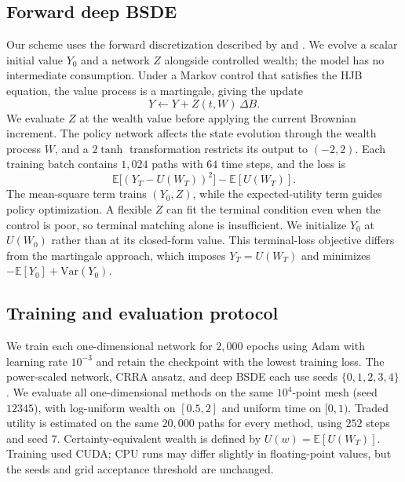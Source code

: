 \documentclass[11pt,a4paper]{article}
\newcommand{\E}{\mathbb{E}}
\begin{document}
\subsection{Forward deep BSDE}

Our scheme uses the forward discretization described by \citet{han2018} and \citet{e2017}. We evolve a scalar initial value $Y_0$ and a network $Z$ alongside controlled wealth; the model has no intermediate consumption. Under a Markov control that satisfies the HJB equation, the value process is a martingale, giving the update
\begin{equation}
Y \leftarrow Y + Z(t,W)\,\Delta B.
\end{equation}
We evaluate $Z$ at the wealth value before applying the current Brownian increment. The policy network affects the state evolution through the wealth process $W$, and a $2\tanh$ transformation restricts its output to $(-2,2)$. Each training batch contains $1{,}024$ paths with $64$ time steps, and the loss is
\begin{equation}
\E\big[(Y_T-U(W_T))^2\big] - \E[U(W_T)].
\end{equation}
The mean-square term trains $(Y_0,Z)$, while the expected-utility term guides policy optimization. A flexible $Z$ can fit the terminal condition even when the control is poor, so terminal matching alone is insufficient. We initialize $Y_0$ at $U(W_0)$ rather than at its closed-form value. This terminal-loss objective differs from the martingale approach, which imposes $Y_T=U(W_T)$ and minimizes $-\E[Y_0]+\mathrm{Var}(Y_0)$.

\subsection{Training and evaluation protocol}

We train each one-dimensional network for $2{,}000$ epochs using Adam with learning rate $10^{-3}$ and retain the checkpoint with the lowest training loss. The power-scaled network, CRRA ansatz, and deep BSDE each use seeds $\{0,1,2,3,4\}$. We evaluate all one-dimensional methods on the same $10^{4}$-point mesh (seed $12345$), with log-uniform wealth on $[0.5,2]$ and uniform time on $[0,1)$. Traded utility is estimated on the same $20{,}000$ paths for every method, using $252$ steps and seed $7$. Certainty-equivalent wealth is defined by $U(w)=\E[U(W_T)]$. Training used CUDA; CPU runs may differ slightly in floating-point values, but the seeds and grid acceptance threshold are unchanged.
\end{document}
